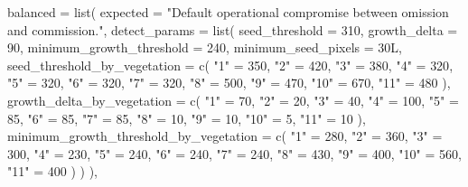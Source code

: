 \documentclass[
  british,
  a4paper,
]{scrbook}
\newenvironment{Shaded}{\begin{snugshade}}{\end{snugshade}}
\newcommand{\AttributeTok}[1]{\textcolor[rgb]{0.40,0.45,0.13}{#1}}
\newcommand{\DecValTok}[1]{\textcolor[rgb]{0.68,0.00,0.00}{#1}}
\newcommand{\FunctionTok}[1]{\textcolor[rgb]{0.28,0.35,0.67}{#1}}
\newcommand{\NormalTok}[1]{\textcolor[rgb]{0.00,0.23,0.31}{#1}}
\newcommand{\OtherTok}[1]{\textcolor[rgb]{0.00,0.23,0.31}{#1}}
\newcommand{\StringTok}[1]{\textcolor[rgb]{0.13,0.47,0.30}{#1}}
\begin{document}
\begin{Shaded}
\begin{Highlighting}[]
  \AttributeTok{balanced =} \FunctionTok{list}\NormalTok{(}
    \AttributeTok{expected =} \StringTok{"Default operational compromise between omission and commission."}\NormalTok{,}
    \AttributeTok{detect\_params =} \FunctionTok{list}\NormalTok{(}
      \AttributeTok{seed\_threshold =} \DecValTok{310}\NormalTok{,}
      \AttributeTok{growth\_delta =} \DecValTok{90}\NormalTok{,}
      \AttributeTok{minimum\_growth\_threshold =} \DecValTok{240}\NormalTok{,}
      \AttributeTok{minimum\_seed\_pixels =} \DecValTok{30}\NormalTok{L,}
      \AttributeTok{seed\_threshold\_by\_vegetation =} \FunctionTok{c}\NormalTok{(}
        \StringTok{"1"} \OtherTok{=} \DecValTok{350}\NormalTok{, }\StringTok{"2"} \OtherTok{=} \DecValTok{420}\NormalTok{, }\StringTok{"3"} \OtherTok{=} \DecValTok{380}\NormalTok{, }\StringTok{"4"} \OtherTok{=} \DecValTok{320}\NormalTok{, }\StringTok{"5"} \OtherTok{=} \DecValTok{320}\NormalTok{,}
        \StringTok{"6"} \OtherTok{=} \DecValTok{320}\NormalTok{, }\StringTok{"7"} \OtherTok{=} \DecValTok{320}\NormalTok{, }\StringTok{"8"} \OtherTok{=} \DecValTok{500}\NormalTok{, }\StringTok{"9"} \OtherTok{=} \DecValTok{470}\NormalTok{, }\StringTok{"10"} \OtherTok{=} \DecValTok{670}\NormalTok{, }\StringTok{"11"} \OtherTok{=} \DecValTok{480}
\NormalTok{      ),}
      \AttributeTok{growth\_delta\_by\_vegetation =} \FunctionTok{c}\NormalTok{(}
        \StringTok{"1"} \OtherTok{=} \DecValTok{70}\NormalTok{, }\StringTok{"2"} \OtherTok{=} \DecValTok{20}\NormalTok{, }\StringTok{"3"} \OtherTok{=} \DecValTok{40}\NormalTok{, }\StringTok{"4"} \OtherTok{=} \DecValTok{100}\NormalTok{, }\StringTok{"5"} \OtherTok{=} \DecValTok{85}\NormalTok{,}
        \StringTok{"6"} \OtherTok{=} \DecValTok{85}\NormalTok{, }\StringTok{"7"} \OtherTok{=} \DecValTok{85}\NormalTok{, }\StringTok{"8"} \OtherTok{=} \DecValTok{10}\NormalTok{, }\StringTok{"9"} \OtherTok{=} \DecValTok{10}\NormalTok{, }\StringTok{"10"} \OtherTok{=} \DecValTok{5}\NormalTok{, }\StringTok{"11"} \OtherTok{=} \DecValTok{10}
\NormalTok{      ),}
      \AttributeTok{minimum\_growth\_threshold\_by\_vegetation =} \FunctionTok{c}\NormalTok{(}
        \StringTok{"1"} \OtherTok{=} \DecValTok{280}\NormalTok{, }\StringTok{"2"} \OtherTok{=} \DecValTok{360}\NormalTok{, }\StringTok{"3"} \OtherTok{=} \DecValTok{300}\NormalTok{, }\StringTok{"4"} \OtherTok{=} \DecValTok{230}\NormalTok{, }\StringTok{"5"} \OtherTok{=} \DecValTok{240}\NormalTok{,}
        \StringTok{"6"} \OtherTok{=} \DecValTok{240}\NormalTok{, }\StringTok{"7"} \OtherTok{=} \DecValTok{240}\NormalTok{, }\StringTok{"8"} \OtherTok{=} \DecValTok{430}\NormalTok{, }\StringTok{"9"} \OtherTok{=} \DecValTok{400}\NormalTok{, }\StringTok{"10"} \OtherTok{=} \DecValTok{560}\NormalTok{, }\StringTok{"11"} \OtherTok{=} \DecValTok{400}
\NormalTok{      )}
\NormalTok{    )}
\NormalTok{  ),}


\end{Highlighting}
\end{Shaded}
\end{document}
